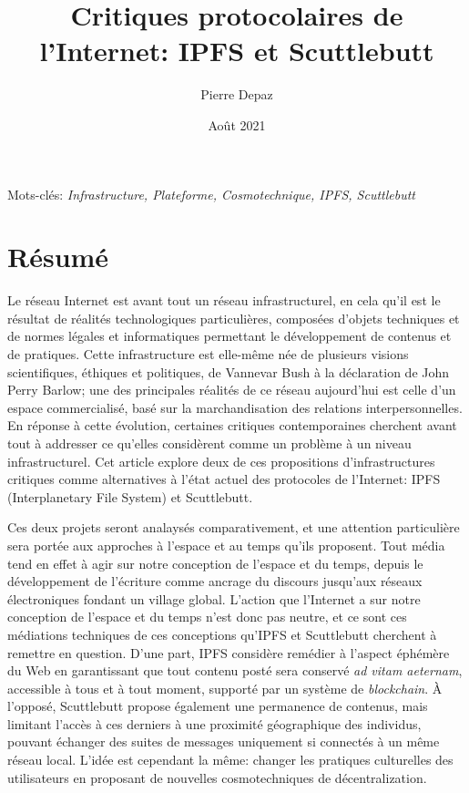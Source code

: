 \documentclass{article}
\begin{document}
\title{Critiques protocolaires de l'Internet: IPFS et Scuttlebutt}
\author{Pierre Depaz}
\date{Août 2021}
\maketitle

Mots-clés: \emph{Infrastructure, Plateforme, Cosmotechnique, IPFS, Scuttlebutt}

\section{Résumé}

Le réseau Internet est avant tout un réseau infrastructurel, en cela qu'il est le résultat de réalités technologiques particulières, composées d'objets techniques et de normes légales et informatiques\cite{lessig_code_1999,galloway_protocol_2004} permettant le développement de contenus et de pratiques. Cette infrastructure est elle-même née de plusieurs visions scientifiques, éthiques et politiques, de Vannevar Bush à la déclaration de John Perry Barlow; une des principales réalités de ce réseau aujourd'hui est celle d'un espace commercialisé, basé sur la marchandisation des relations interpersonnelles\cite{couldry_costs_2019}. En réponse à cette évolution, certaines critiques contemporaines cherchent avant tout à addresser ce qu'elles considèrent comme un problème à un niveau infrastructurel. Cet article explore deux de ces propositions d'infrastructures critiques comme alternatives à l'état actuel des protocoles de l'Internet: IPFS (Interplanetary File System) et Scuttlebutt.

Ces deux projets seront analaysés comparativement, et une attention particulière sera portée aux approches à l'espace et au temps qu'ils proposent. Tout média tend en effet à agir sur notre conception de l'espace et du temps, depuis le développement de l'écriture comme ancrage du discours jusqu'aux réseaux électroniques fondant un village global\cite{ong_orality_2012}. L'action que l'Internet a sur notre conception de l'espace et du temps\cite{kitchin_codespace_2011} n'est donc pas neutre, et ce sont ces médiations techniques de ces conceptions qu'IPFS et Scuttlebutt cherchent à remettre en question. D'une part, IPFS\cite{benet_ipfs_2014} considère remédier à l'aspect éphémère du Web en garantissant que tout contenu posté sera conservé \emph{ad vitam aeternam}, accessible à tous et à tout moment, supporté par un système de \emph{blockchain}. À l'opposé, Scuttlebutt\cite{tarr_secure_2019} propose également une  permanence de contenus, mais limitant l'accès à ces derniers à une proximité géographique des individus, pouvant échanger des suites de messages uniquement si connectés à un même réseau local. L'idée est cependant la même: changer les pratiques culturelles des utilisateurs en proposant de nouvelles cosmotechniques de décentralization\cite{hui_question_2016}.
\end{document}
